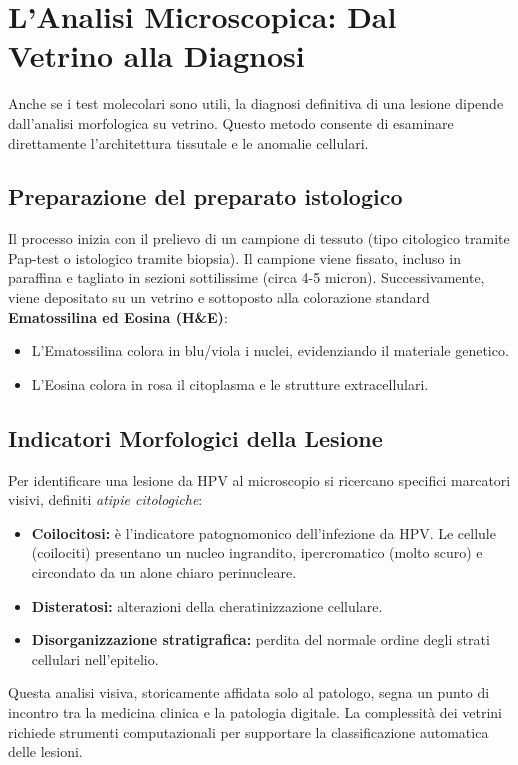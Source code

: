 \section{L'Analisi Microscopica: Dal Vetrino alla Diagnosi}
Anche se i test molecolari sono utili, la diagnosi definitiva di una lesione dipende dall'analisi morfologica su vetrino. Questo metodo consente di esaminare direttamente l'architettura tissutale e le anomalie cellulari.

\subsection{Preparazione del preparato istologico}
Il processo inizia con il prelievo di un campione di tessuto (tipo citologico tramite Pap-test o istologico tramite biopsia). Il campione viene fissato, incluso in paraffina e tagliato in sezioni sottilissime (circa 4-5 micron). Successivamente, viene depositato su un vetrino e sottoposto alla colorazione standard \textbf{Ematossilina ed Eosina (H\&E)}:
\begin{itemize}
	\item L'Ematossilina colora in blu/viola i nuclei, evidenziando il materiale genetico.
	\item L'Eosina colora in rosa il citoplasma e le strutture extracellulari.
\end{itemize}

\subsection{Indicatori Morfologici della Lesione}
Per identificare una lesione da HPV al microscopio si ricercano specifici marcatori visivi, definiti \textit{atipie citologiche}:
\begin{itemize}
	\item \textbf{Coilocitosi:} è l'indicatore patognomonico dell'infezione da HPV. Le cellule (coilociti) presentano un nucleo ingrandito, ipercromatico (molto scuro) e circondato da un alone chiaro perinucleare.
	\item \textbf{Disteratosi:} alterazioni della cheratinizzazione cellulare.
	\item \textbf{Disorganizzazione stratigrafica:} perdita del normale ordine degli strati cellulari nell'epitelio.
\end{itemize}

Questa analisi visiva, storicamente affidata solo al patologo, segna un punto di incontro tra la medicina clinica e la patologia digitale. La complessità dei vetrini richiede strumenti computazionali per supportare la classificazione automatica delle lesioni.

